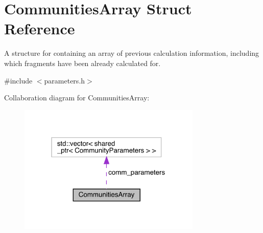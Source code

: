 \hypertarget{struct_communities_array}{}\section{Communities\+Array Struct Reference}
\label{struct_communities_array}


A structure for containing an array of previous calculation information, including which fragments have been already calculated for.  




{\ttfamily \#include $<$parameters.\+h$>$}



Collaboration diagram for Communities\+Array\+:
\nopagebreak
\begin{figure}[H]
\begin{center}
\leavevmode
\includegraphics[width=247pt]{struct_communities_array__coll__graph}
\end{center}
\end{figure}
